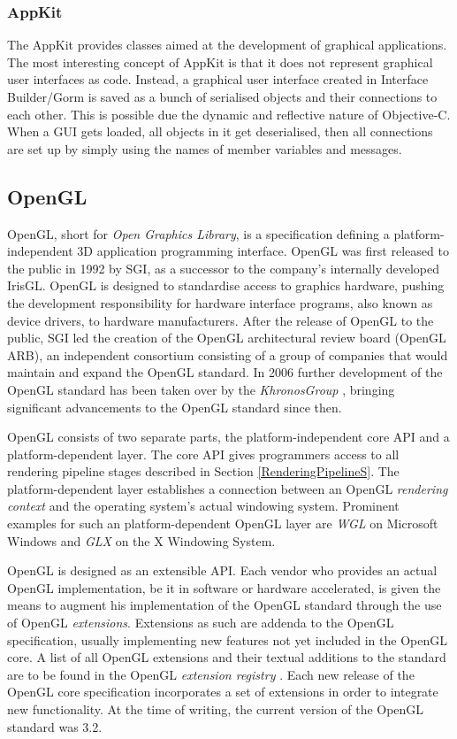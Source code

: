 \subsubsection{AppKit}

The AppKit provides classes aimed at the development of graphical applications.
The most interesting concept of AppKit is that it does not represent graphical
user interfaces as code. Instead, a graphical user interface created in
Interface Builder/Gorm is saved as a bunch of serialised objects and their
connections to each other. This is possible due the dynamic and reflective
nature of Objective-C. When a GUI gets loaded, all objects in it get
deserialised, then all connections are set up by simply using the names of
member variables and messages. 

\subsection{OpenGL}
OpenGL, short for \textit{Open Graphics Library}, is a specification defining a
platform-independent 3D application programming interface. OpenGL was first
released to the public in 1992 by SGI, as a successor to the company's
internally developed IrisGL. OpenGL is designed to standardise access to
graphics hardware, pushing the development responsibility for hardware interface
programs, also known as device drivers, to hardware manufacturers. After the
release of OpenGL to the public, SGI led the creation of the OpenGL
architectural review board (OpenGL ARB)\cite{misc:opengl-arb}, an independent
consortium consisting of a group of companies that would maintain and expand the
OpenGL standard. In 2006 further development of the OpenGL standard has been
taken over by the \textit{KhronosGroup} \cite{misc:opengl-khronos}, bringing
significant advancements to the OpenGL standard since then.

OpenGL consists of two separate parts, the platform-independent core API and a
platform-dependent layer. The core API gives programmers access to all
rendering pipeline stages described in Section \ref{RenderingPipelineS}. The
platform-dependent layer establishes a connection between an OpenGL
\textit{rendering context} and the operating system's actual windowing system.
Prominent examples for such an platform-dependent OpenGL layer are \textit{WGL}
on Microsoft Windows and \textit{GLX} on the X Windowing System.

OpenGL is designed as an extensible API. Each vendor who provides an actual
OpenGL implementation, be it in software or hardware accelerated, is given the
means to augment his implementation of the OpenGL standard through the use of
OpenGL \textit{extensions}. Extensions as such are addenda to the OpenGL
specification, usually implementing new features not yet included in the OpenGL
core. A list of all OpenGL extensions and their textual additions to the
standard are to be found in the OpenGL \textit{extension registry}
\cite{misc:opengl-registry}. Each new release of the OpenGL core specification
incorporates a set of extensions in order to integrate new functionality. At the
time of writing, the current version of the OpenGL standard was 3.2.

